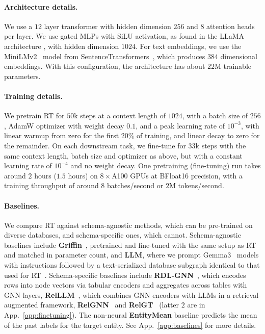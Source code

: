
\paragraph{Architecture details.}
We use a $12$ layer transformer
with hidden dimension $256$ and
$8$ attention heads per layer.
We use gated MLPs with SiLU activation,
as found in the LLaMA architecture \citep{llama},
with hidden dimension $1024$.
For text embeddings,
we use the MiniLMv2~\citep{minilmv2} model
from SentenceTransformers~\citep{sentence_transformers},
which produces $384$ dimensional embeddings.
With this configuration,
the architecture has about $22$M trainable parameters.

\paragraph{Training details.}
We pretrain RT for $50$k steps
at a context length of $1024$,
with a batch size of $256$,
AdamW optimizer with weight decay $0.1$,
and a peak learning rate of $10^{-3}$,
with linear warmup from zero for the first $20\%$ of training,
and linear decay to zero for the remainder.
On each downstream task,
we fine-tune for $33$k steps
with the same context length, batch size and optimizer as above,
but with a constant learning rate of $10^{-4}$
and no weight decay.
One pretraining (fine-tuning) run takes
around $2$ hours ($1.5$ hours) on $8\times$A100 GPUs at BFloat16 precision,
with a training throughput of around $8$ batches/second or $2$M tokens/second.


\paragraph{Baselines.}
We compare RT against schema-agnostic methods,
which can be pre-trained on diverse databases,
and schema-specific ones,
which cannot. Schema-agnostic baselines include \textbf{Griffin}~\citep{griffin}, pretrained and fine-tuned with the same setup as RT and matched in parameter count, and \textbf{LLM}, where we prompt Gemma3~\citep{gemma3} models with instructions followed by a text-serialized database subgraph identical to that used for RT~\citep{snowflake2024relational}. Schema-specific baselines include \textbf{RDL-GNN}~\citep{relbench}, which encodes rows into node vectors via tabular encoders and aggregates across tables with GNN layers, \textbf{RelLLM}~\citep{relllm}, which combines GNN encoders with LLMs in a retrieval-augmented framework, \textbf{RelGNN}~\citep{relgnn} and \textbf{RelGT}~\citep{relgt} (latter $2$ are in App.~\ref{app:finetuning}).
The non-neural \textbf{EntityMean} baseline predicts the mean of the past labels for the target entity. See App.~\ref{app:baselines} for more details.

